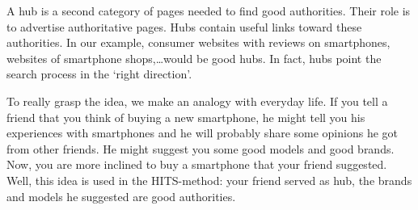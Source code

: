 \documentclass[a4paper,11pt]{report}
\begin{document}
A hub is a second category of pages needed to find good authorities. Their role 
is to advertise authoritative pages. Hubs contain useful links toward these 
authorities. In our example, consumer websites with reviews on smartphones, 
websites of smartphone shops,\ldots would be good hubs. In fact, hubs point the 
search process in the `right direction'.

To really grasp the idea, we make an analogy with everyday life. If you tell a 
friend that you think of buying a new smartphone, he might tell you his 
experiences with smartphones and he will probably share some opinions he got from other friends. 
He might suggest you some good models and good brands. Now, you are more inclined to 
buy a smartphone that your friend suggested. Well, this idea is used in the 
HITS-method: your friend served as hub, the brands and models he suggested are good 
authorities.
\end{document}
